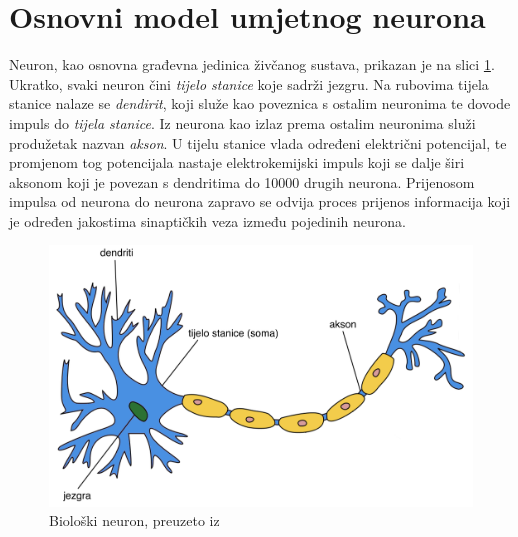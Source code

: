 \section{Osnovni model umjetnog neurona}
Neuron, kao osnovna građevna jedinica živčanog sustava, prikazan je na slici \ref{fig:biological_neuron}. Ukratko, svaki neuron čini \emph{tijelo stanice} koje sadrži jezgru. Na rubovima tijela stanice nalaze se \emph{dendirit}, koji služe kao poveznica s ostalim neuronima te dovode impuls do \emph{tijela stanice}. Iz neurona kao izlaz prema ostalim neuronima služi produžetak nazvan \emph{akson}. U tijelu stanice vlada određeni električni potencijal, te promjenom tog potencijala nastaje elektrokemijski impuls koji se dalje širi aksonom koji je povezan s dendritima do 10000 drugih neurona. Prijenosom impulsa od neurona do neurona zapravo se odvija proces prijenos informacija koji je određen jakostima sinaptičkih veza između pojedinih neurona.
\begin{figure}[htb]
    \centering
    \includegraphics[width=14cm]{images/biological_neuron.jpg}
    \caption{Biološki neuron, preuzeto iz \citep{wikiNeuron}}
    \label{fig:biological_neuron}
\end{figure}

